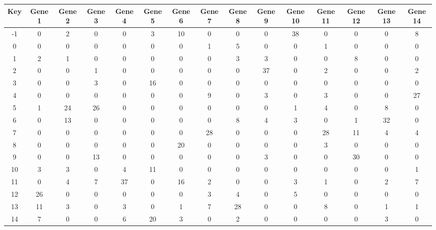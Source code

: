 \begin{tabular}{|c|c|c|c|c|c|c|c|c|c|c|c|c|c|c|}
\hline
Key & Gene 1 & Gene 2 & Gene 3 & Gene 4 & Gene 5 & Gene 6 & Gene 7 & Gene 8 & Gene 9 & Gene 10 & Gene 11 & Gene 12 & Gene 13 & Gene 14 \\
\hline
-1 & 0 & 2 & 0 & 0 & 3 & 10 & 0 & 0 & 0 & 38 & 0 & 0 & 0 & 8 \\
0 & 0 & 0 & 0 & 0 & 0 & 0 & 1 & 5 & 0 & 0 & 1 & 0 & 0 & 0 \\
1 & 2 & 1 & 0 & 0 & 0 & 0 & 0 & 3 & 3 & 0 & 0 & 8 & 0 & 0 \\
2 & 0 & 0 & 1 & 0 & 0 & 0 & 0 & 0 & 37 & 0 & 2 & 0 & 0 & 2 \\
3 & 0 & 0 & 3 & 0 & 16 & 0 & 0 & 0 & 0 & 0 & 0 & 0 & 0 & 0 \\
4 & 0 & 0 & 0 & 0 & 0 & 0 & 9 & 0 & 3 & 0 & 3 & 0 & 0 & 27 \\
5 & 1 & 24 & 26 & 0 & 0 & 0 & 0 & 0 & 0 & 1 & 4 & 0 & 8 & 0 \\
6 & 0 & 13 & 0 & 0 & 0 & 0 & 0 & 8 & 4 & 3 & 0 & 1 & 32 & 0 \\
7 & 0 & 0 & 0 & 0 & 0 & 0 & 28 & 0 & 0 & 0 & 28 & 11 & 4 & 4 \\
8 & 0 & 0 & 0 & 0 & 0 & 20 & 0 & 0 & 0 & 0 & 3 & 0 & 0 & 0 \\
9 & 0 & 0 & 13 & 0 & 0 & 0 & 0 & 0 & 3 & 0 & 0 & 30 & 0 & 0 \\
10 & 3 & 3 & 0 & 4 & 11 & 0 & 0 & 0 & 0 & 0 & 0 & 0 & 0 & 1 \\
11 & 0 & 4 & 7 & 37 & 0 & 16 & 2 & 0 & 0 & 3 & 1 & 0 & 2 & 7 \\
12 & 26 & 0 & 0 & 0 & 0 & 0 & 3 & 4 & 0 & 5 & 0 & 0 & 0 & 0 \\
13 & 11 & 3 & 0 & 3 & 0 & 1 & 7 & 28 & 0 & 0 & 8 & 0 & 1 & 1 \\
14 & 7 & 0 & 0 & 6 & 20 & 3 & 0 & 2 & 0 & 0 & 0 & 0 & 3 & 0 \\
\hline
\end{tabular}
